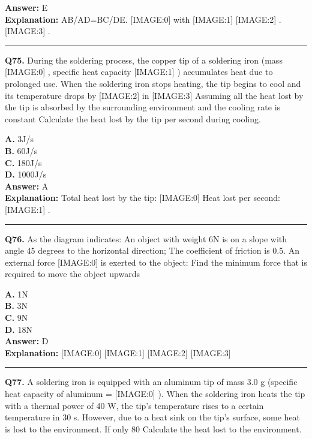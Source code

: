 \documentclass[12pt]{article}
\begin{document}
\textbf{Answer:} E \\
\textbf{Explanation:} AB/AD=BC/DE.
[IMAGE:0]
with
[IMAGE:1]
[IMAGE:2]
.
[IMAGE:3]
.

\hrule
\vspace{1em}


\noindent
\textbf{Q75.} During the soldering process, the copper tip of a soldering iron (mass
[IMAGE:0]
, specific heat capacity
[IMAGE:1]
) accumulates heat due to prolonged use. When the soldering iron stops heating, the tip begins to cool and its temperature drops by
[IMAGE:2]
in
[IMAGE:3]
Assuming all the heat lost by the tip is absorbed by the surrounding environment and the cooling rate is constant
Calculate the heat lost by the tip per second during cooling.



\textbf{A.} 3J/s \\
\textbf{B.} 60J/s \\
\textbf{C.} 180J/s \\
\textbf{D.} 1000J/s \\

\textbf{Answer:} A \\
\textbf{Explanation:} Total heat lost by the tip:
[IMAGE:0]
Heat lost per second:
[IMAGE:1]
.

\hrule
\vspace{1em}


\noindent
\textbf{Q76.} As the diagram indicates: An object with weight 6N is on a slope with angle 45 degrees to the horizontal direction; The coefficient of friction is 0.5. An external force
[IMAGE:0]
is exerted to the object: Find the minimum force that is required to move the object upwards



\textbf{A.} 1N \\
\textbf{B.} 3N \\
\textbf{C.} 9N \\
\textbf{D.} 18N \\

\textbf{Answer:} D \\
\textbf{Explanation:} [IMAGE:0]
[IMAGE:1]
[IMAGE:2]
[IMAGE:3]

\hrule
\vspace{1em}


\noindent
\textbf{Q77.} A soldering iron is equipped with an aluminum tip of mass 3.0 g (specific heat capacity of aluminum =
[IMAGE:0]
). When the soldering iron heats the tip with a thermal power of 40 W, the tip's temperature rises to a certain temperature in 30 s. However, due to a heat sink on the tip's surface, some heat is lost to the environment. If only 80%
Calculate the heat lost to the environment.
\end{document}
